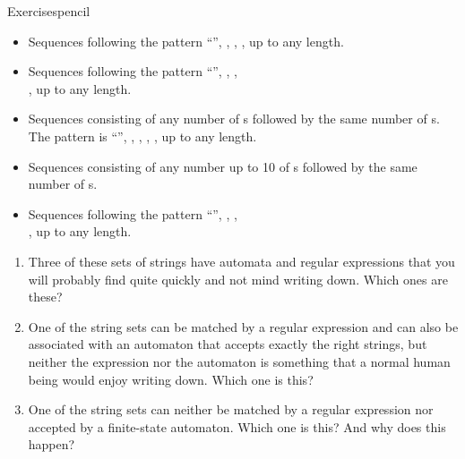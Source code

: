 \begin{tblsfilledsymbol}{Exercises}{pencil}
\begin{enumerate}
  \begin{itemize}
  \item Sequences following the pattern ``'', , ,  , up to any length.
  \item Sequences following the pattern ``'', , ,\\  , up to any length.
  \item Sequences consisting of any number of s followed by the same number of s. The pattern is ``'', , ,
    , , up to any length.
  \item Sequences consisting of any number up to 10 of s followed by the same number of s.
  \item Sequences following the pattern ``'', , ,\\ , up to any length.
  \end{itemize}

  \begin{enumerate}
  \item Three of these sets of strings have automata and regular expressions that you will probably find quite quickly and not mind  writing down. Which ones are these? 

  \item One of the string sets can be matched by a regular expression and can also be associated with an automaton that accepts exactly     the right strings, but neither the expression nor the automaton is     something that a normal human being would enjoy writing     down. Which one is this?

 \item One of the string sets can neither be matched by a regular expression nor accepted by a  finite-state automaton. Which one is this? And why does this happen?
  \end{enumerate}
\end{enumerate}
\end{tblsfilledsymbol}


